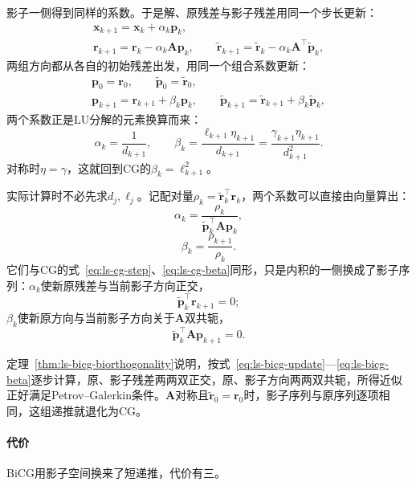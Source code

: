 影子一侧得到同样的系数。于是解、原残差与影子残差用同一个步长更新：
\begin{equation}
 \begin{gathered}
 \bm x_{k+1}=\bm x_k+\alpha_k\bm p_k,\\
 \bm r_{k+1}=\bm r_k-\alpha_k\bm A\bm p_k,\qquad
 \widetilde{\bm r}_{k+1}=\widetilde{\bm r}_k-\alpha_k\bm A^\top\widetilde{\bm p}_k ,
 \end{gathered}
 \label{eq:ls-bicg-update}
\end{equation}
两组方向都从各自的初始残差出发，用同一个组合系数更新：
\begin{equation}
 \begin{gathered}
 \bm p_0=\bm r_0,\qquad \widetilde{\bm p}_0=\widetilde{\bm r}_0,\\
 \bm p_{k+1}=\bm r_{k+1}+\beta_k\bm p_k,\qquad
 \widetilde{\bm p}_{k+1}=\widetilde{\bm r}_{k+1}+\beta_k\widetilde{\bm p}_k ,
 \end{gathered}
 \label{eq:ls-bicg-direction}
\end{equation}
两个系数正是LU分解的元素换算而来：
\[
 \alpha_k=\frac1{d_{k+1}},\qquad \beta_k=\frac{\ell_{k+1}\eta_{k+1}}{d_{k+1}}=\frac{\gamma_{k+1}\eta_{k+1}}{d_{k+1}^2} .
\]
对称时$\eta=\gamma$，这就回到CG的$\beta_k=\ell_{k+1}^2$。

实际计算时不必先求$d_j,\ell_j$。记配对量$\rho_k=\widetilde{\bm r}_k^\top\bm r_k$，两个系数可以直接由向量算出：
\begin{equation}
 \alpha_k=\frac{\rho_k}{\widetilde{\bm p}_k^\top\bm A\bm p_k},
 \label{eq:ls-bicg-step}
\end{equation}
\begin{equation}
 \beta_k=\frac{\rho_{k+1}}{\rho_k}.
 \label{eq:ls-bicg-beta}
\end{equation}
它们与CG的式~\eqref{eq:ls-cg-step}、\eqref{eq:ls-cg-beta}同形，只是内积的一侧换成了影子序列：$\alpha_k$使新原残差与当前影子方向正交，
\[
 \widetilde{\bm p}_k^\top\bm r_{k+1}=0 ;
\]
$\beta_k$使新原方向与当前影子方向关于$\bm A$双共轭，
\[
 \widetilde{\bm p}_k^\top\bm A\bm p_{k+1}=0 .
\]

定理~\ref{thm:ls-bicg-biorthogonality}说明，按式~\eqref{eq:ls-bicg-update}—\eqref{eq:ls-bicg-beta}逐步计算，原、影子残差两两双正交，原、影子方向两两双共轭，所得近似正好满足Petrov--Galerkin条件。$\bm A$对称且$\widetilde{\bm r}_0=\bm r_0$时，影子序列与原序列逐项相同，这组递推就退化为CG。

\paragraph{代价}
BiCG用影子空间换来了短递推，代价有三。

